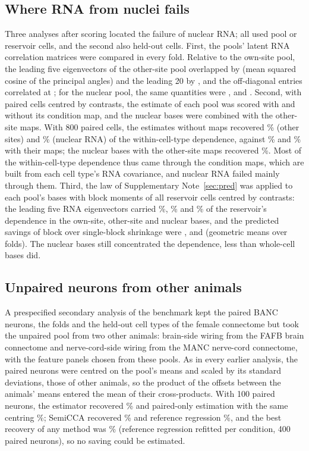 \subsection*{Where RNA from nuclei fails}
Three analyses after scoring located the failure of nuclear RNA; all used pool or reservoir cells, and the second also held-out cells. First, the pools' latent RNA correlation matrices were compared in every fold. Relative to the own-site pool, the leading five eigenvectors of the other-site pool overlapped by \DpOverlapOther{} (mean squared cosine of the principal angles) and the leading 20 by \DpOverlapOtherTwenty, and the off-diagonal entries correlated at \DpROther; for the nuclear pool, the same quantities were \DpOverlapAssay, \DpOverlapAssayTwenty{} and \DpRAssay. Second, with paired cells centred by contrasts, the estimate of each pool was scored with and without its condition map, and the nuclear bases were combined with the other-site maps. With 800 paired cells, the estimates without maps recovered \MpOtherUnmapped\% (other sites) and \MpAssayUnmapped\% (nuclear RNA) of the within-cell-type dependence, against \MpOtherMapped\% and \MpAssayMapped\% with their maps; the nuclear bases with the other-site maps recovered \MpAssayOtherMap\%. Most of the within-cell-type dependence thus came through the condition maps, which are built from each cell type's RNA covariance, and nuclear RNA failed mainly through them. Third, the law of Supplementary Note~\ref{sec:pred} was applied to each pool's bases with block moments of all reservoir cells centred by contrasts: the leading five RNA eigenvectors carried \LwWSame\%, \LwWOther\% and \LwWAssay\% of the reservoir's dependence in the own-site, other-site and nuclear bases, and the predicted savings of block over single-block shrinkage were \LwSame, \LwOther{} and \LwAssay{} (geometric means over folds). The nuclear bases still concentrated the dependence, less than whole-cell bases did.

\subsection*{Unpaired neurons from other animals}
A prespecified secondary analysis of the benchmark kept the paired BANC neurons, the folds and the held-out cell types of the female connectome but took the unpaired pool from two other animals: brain-side wiring from the FAFB brain connectome\cite{dorkenwald2024,schlegel2024} and nerve-cord-side wiring from the MANC nerve-cord connectome\cite{takemura2024}, with the feature panels chosen from these pools. As in every earlier analysis, the paired neurons were centred on the pool's means and scaled by its standard deviations, those of other animals, so the product of the offsets between the animals' means entered the mean of their cross-products. With 100 paired neurons, the estimator recovered \GenRfHundredBancX\% and paired-only estimation with the same centring \GenPairedOnlyHundredBancX\%; SemiCCA recovered \GenSemiHundredBancX\% and reference regression \GenRidgeHundredBancX\%, and the best recovery of any method was \GenLevelBancX\% (reference regression refitted per condition, 400 paired neurons), so no saving could be estimated.


